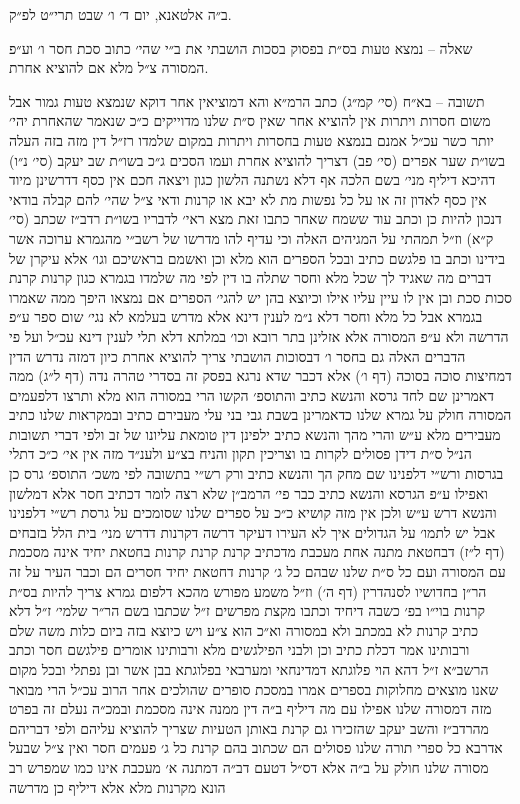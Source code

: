 \documentclass[12pt, openany]{book}
\begin{document}
\begin{multicols}{2}
ב״ה אלטאנא, יום ד׳ ו׳ שבט תרי״ט לפ״ק.\\\vspace{0pt}

שאלה – נמצא טעות בס״ת בפסוק בסכות הושבתי את ב״י שהי׳ כתוב סכת חסר ו׳ וע״פ המסורה צ״ל מלא אם להוציא אחרת.\\\vspace{0pt}

תשובה – בא״ח (סי׳ קמ״ג) כתב הרמ״א והא דמוציאין אחר דוקא שנמצא טעות גמור אבל משום חסרות ויתרות אין להוציא אחר שאין ס״ת שלנו מדוייקים כ״כ שנאמר שהאחרת יהי׳ יותר כשר עכ״ל אמנם בנמצא טעות בחסרות ויתרות במקום שלמדו רז״ל דין מזה בזה העלה בשו״ת שער אפרים (סי׳ פב) דצריך להוציא אחרת ועמו הסכים ג״כ בשו״ת שב יעקב (סי׳ נ״ו) דהיכא דיליף מני׳ בשם הלכה אף דלא נשתנה הלשון כגון ויצאה חכם אין כסף דדרשינן מיוד אין כסף לאדון זה או על כל נפשות מת לא יבא או קרנות ודאי צ״ל שהי׳ להם קבלה בודאי דנכון להיות כן וכתב עוד ששמח שאחר כתבו זאת מצא ראי׳ לדבריו בשו״ת רדב״ז שכתב (סי׳ ק״א) וז״ל תמהתי על המגיהים האלה וכי עדיף להו מדרשו של רשב״י מהגמרא ערוכה אשר בידינו וכתב בו פלגשם כתיב ובכל הספרים הוא מלא וכן ואשמם בראשיכם וגו׳ אלא עיקרן של דברים מה שאגיד לך שכל מלא וחסר שתלה בו דין לפי מה שלמדו בגמרא כגון קרנות קרנת סכות סכת ובן אין לו עיין עליו אילו וכיוצא בהן יש להגי׳ הספרים אם נמצאו היפך ממה שאמרו בגמרא אבל כל מלא וחסר דלא נ״מ לענין דינא אלא מדרש בעלמא לא נגי׳ שום ספר ע״פ הדרשה ולא ע״פ המסורה אלא אזלינן בתר רובא וכו׳ במלתא דלא תלי לענין דינא עכ״ל ועל פי הדברים האלה גם בחסר ו׳ דבסוכות הושבתי צריך להוציא אחרת כיון דמזה נדרש הדין דמחיצות סוכה בסוכה (דף ו׳) אלא דכבר שדא נרגא בפסק זה בסדרי טהרה נדה (דף ל״ג) ממה דאמרינן שם לחד גרסא והנשא כתיב והתוספ׳ הקשו הרי במסורה הוא מלא ותרצו דלפעמים המסורה חולק על גמרא שלנו כדאמרינן בשבת גבי בני עלי מעבירם כתיב ובמקראות שלנו כתיב מעבירים מלא ע״ש והרי מהך והנשא כתיב ילפינן דין טומאת עליונו של זב ולפי דברי תשובות הנ״ל ס״ת דידן פסולים לקרות בו וצריכין תקון והניח בצ״ע ולענ״ד מזה אין אי׳ כ״כ דתלי בגרסות ורש״י דלפנינו שם מחק הך והנשא כתיב ורק רש״י בתשובה לפי משכ׳ התוספ׳ גרס כן ואפילו ע״פ הגרסא והנשא כתיב כבר פי׳ הרמב״ן שלא רצה לומר דכתיב חסר אלא דמלשון והנשא דרש ע״ש ולכן אין מזה קושיא כ״כ על ספרים שלנו שסומכים על גרסת רש״י דלפנינו אבל יש לתמו׳ על הגדולים איך לא העירו דעיקר דרשה דקרנות דדרש מני׳ בית הלל בזבחים (דף ל״ז) דבחטאת מתנה אחת מעכבת מדכתיב קרנת קרנת קרנות בחטאת יחיד אינה מסכמת עם המסורה ועם כל ס״ת שלנו שבהם כל ג׳ קרנות דחטאת יחיד חסרים הם וכבר העיר על זה הר״ן בחדושיו לסנהדרין (דף ה׳) וז״ל משמע מפורש מהכא דלפום גמרא צריך להיות בס״ת קרנות בוי״ו בפ׳ כשבה דיחיד וכתבו מקצת מפרשים ז״ל שכתבו בשם הר״ר שלמי׳ ז״ל דלא כתיב קרנות לא במכתב ולא במסורה וא״כ הוא צ״ע ויש כיוצא בזה ביום כלות משה שלם ורבותינו אמר דכלת כתיב וכן ולבני הפילגשים מלא ורבותינו אומרים פילגשם חסר וכתב הרשב״א ז״ל דהא הוי פלוגתא דמדינחאי ומערבאי בפלוגתא בבן אשר ובן נפתלי ובכל מקום שאנו מוצאים מחלוקות בספרים אמרו במסכת סופרים שהולכים אחר הרוב עכ״ל הרי מבואר מזה דמסורה שלנו אפילו עם מה דיליף ב״ה דין ממנה אינה מסכמת ובמכ״ה נעלם זה בפרט מהרדב״ז והשב יעקב שהזכירו גם קרנת באותן הטעיות שצריך להוציא עליהם ולפי דבריהם אדרבא כל ספרי תורה שלנו פסולים הם שכתוב בהם קרנת כל ג׳ פעמים חסר ואין צ״ל שבעל מסורה שלנו חולק על ב״ה אלא דס״ל דטעם דב״ה דמתנה א׳ מעכבת אינו כמו שמפרש רב הונא מקרנות מלא אלא דיליף כן מדרשה 
\end{multicols}
\end{document}
